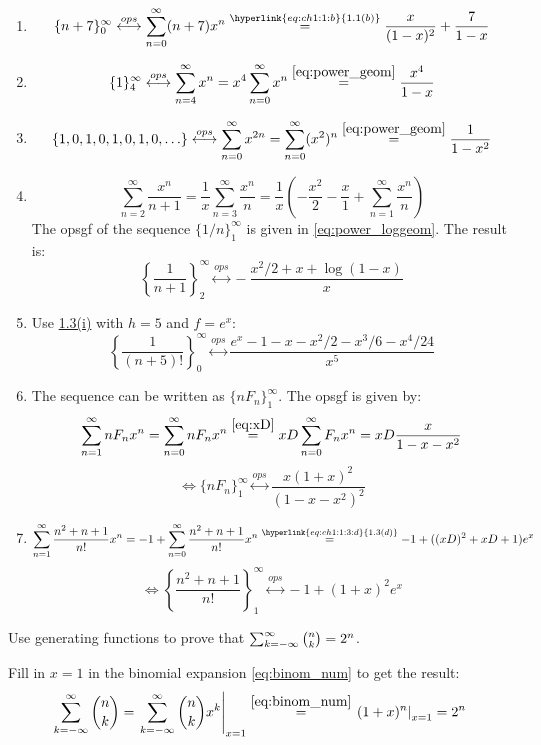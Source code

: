\begin{solution}
    \begin{enumerate}[label=(\alph*)]
        \item
        \[
            \{n+7\}_0^\infty \stackrel{ops}{\longleftrightarrow} \bsum (n+7)x^n \estep{\hyperlink{eq:ch1:1:b}{1.1(b)}} \frac{x}{(1-x)^2} + \frac{7}{1-x}
        \]
        \item \[
            \{1\}_4^\infty \stackrel{ops}{\longleftrightarrow} \sum_{n=4}^\infty x^n = x^4\sum_{n=0}^\infty x^n \estep{\eqref{eq:power_geom}} \frac{x^4}{1-x}
        \]
        \item \[
            \{1,0,1,0,1,0,1,0,\ldots\} \stackrel{ops}{\longleftrightarrow} \bsum x^{2n} = \bsum (x^2)^n \estep{\eqref{eq:power_geom}} \frac{1}{1-x^2}
        \]
        \item \[
             \sum_{n=2}^\infty \frac{x^n}{n+1} 
            = \frac{1}{x} \sum_{n=3}^\infty \frac{x^n}{n} = \frac{1}{x} \left( -\frac{x^2}{2} - \frac{x}{1} + \sum_{n=1}^\infty \frac{x^n}{n} \right)
        \]
        The opsgf of the sequence $\{1/n\}_1^\infty$ is given in \eqref{eq:power_loggeom}. The result is:
        \[
            \left\{\frac{1}{n+1}\right\}_2^\infty \stackrel{ops}{\longleftrightarrow} -\frac{x^2 /2 + x + \log(1-x) }{x}
        \]
        \item Use \hyperlink{eq:ch1:3:i}{1.3(i)} with $h=5$ and $f=e^x$:
        \[
            \left\{\frac{1}{(n+5)!}\right\}_0^\infty \stackrel{ops}{\longleftrightarrow} \frac{e^x - 1 - x - x^2/2 - x^3/6 - x^4/24}{x^5}
        \]
        \item The sequence can be written as $\{nF_{n}\}_1^\infty$. The opsgf is given by:
        \[
            \sum_{n=1}^\infty nF_{n} x^n = \bsum nF_{n}x^{n} \estep{\eqref{eq:xD}} xD \bsum F_nx^n = xD \frac{x}{1-x-x^2}
        \]
        \[
            \Longleftrightarrow \{nF_{n}\}_1^\infty \stackrel{ops}{\longleftrightarrow} \frac{x(1+x)^2}{(1-x-x^2)^2}
        \]
        \item \[
            \sum_{n=1}^\infty \frac{n^2+n+1}{n!}x^n = - 1 +\bsum \frac{n^2+n+1}{n!}x^n \estep{\hyperlink{eq:ch1:1:3:d}{1.3(d)}} -1 + ((xD)^2 + xD + 1)e^x
        \]
        \[
           \Longleftrightarrow \left\{\frac{n^2 + n + 1}{n!}\right\}_1^\infty\stackrel{ops}{\longleftrightarrow} -1 + (1+x)^2e^x
        \]
    \end{enumerate}
\end{solution}

\begin{exercise}
    Use generating functions to prove that $\infsum[k] \binom{n}{k} = 2^n$.
\end{exercise}
\begin{solution}
    Fill in $x=1$ in the binomial expansion \eqref{eq:binom_num} to get the result:
    \[
        \infsum[k] \binom{n}{k} = \left.\infsum[k] \binom{n}{k}x^k \right\rvert_{x=1} \estep{\eqref{eq:binom_num}} \left.(1+x)^n \right\rvert_{x=1} = 2^n
    \]
\end{solution}

